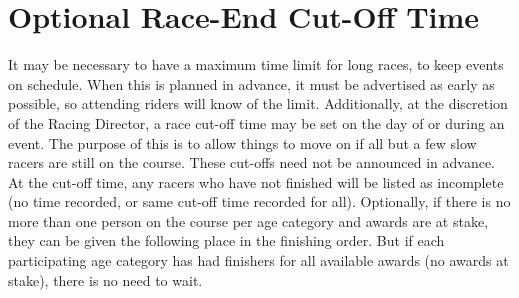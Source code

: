 \section{Optional Race-End Cut-Off Time}
It may be necessary to have a maximum time limit for long races, to keep events on schedule.
When this is planned in advance, it must be advertised as early as possible, so attending riders will know of the limit.
Additionally, at the discretion of the Racing Director, a race cut-off time may be set on the day of or during an event.
The purpose of this is to allow things to move on if all but a few slow racers are still on the course.
These cut-offs need not be announced in advance.
At the cut-off time, any racers who have not finished will be listed as incomplete (no time recorded, or same cut-off time recorded for all).
Optionally, if there is no more than one person on the course per age category and awards are at stake, they can be given the following place in the finishing order.
But if each participating age category has had finishers for all available awards (no awards at stake), there is no need to wait.



